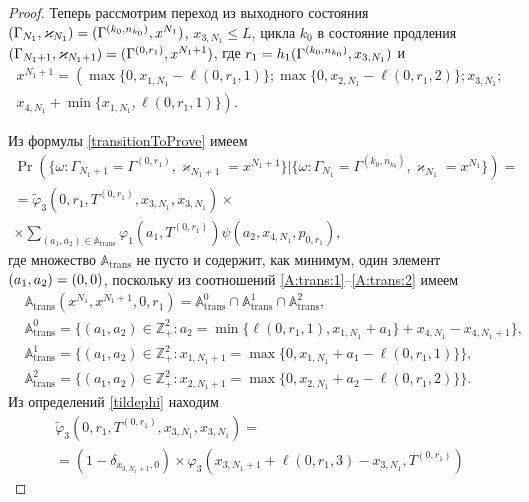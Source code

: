 \begin{proof}
Теперь рассмотрим переход из выходного состояния $(\Gamma_{N_1},  \varkappa_{N_1}) \hm= (\Gamma^{(k_0,  n_{k_0})},  x^{N_1})$,  $x_{3,  N_1} \leqslant L$,  цикла $k_0$ в состояние продления $(\Gamma_{N_1+1}, \varkappa_{N_1+1}) \hm= (\Gamma^{(0, r_1)},  x^{N_1+1})$,  где $r_1 \hm= h_1(\Gamma^{(k_0,  n_{k_0})},  x_{3, N_1})$ и 
\begin{multline*}
x^{N_1+1}=\left(\max{\{0,  x_{1, N_1} - \ell(0,  r_1, 1)\}};
\max{\{0,  x_{2,  N_1} - \ell(0,  r_1,  2)\}};x_{3,  N_1};\right.\\
\left.
x_{4,  N_1} + \min{\{x_{1,  N_1},  \ell(0,  r_1,  1)\}}\right).
\end{multline*}

Из формулы \eqref{transitionToProve} имеем
\begin{multline*}
\Pr (\{\omega\colon \Gamma_{N_1+1}=\Gamma^{(0,  r_1)}, \varkappa_{N_1+1}=x^{N_1+1} \}|\{\omega\colon  \Gamma_{N_1}=\Gamma^{(k_0,  n_{k_0})}, \varkappa_{N_1}=x^{N_1}\})=\\
=\widetilde{\varphi}_3(0,  r_1,  T^{(0,  r_1)}, x_{3,  N_1}, x_{3,  N_1})\times \\
\times
\sum_{(a_1,  a_2)\in {\mathbb A}_{\mathrm{trans}}}\varphi_1(a_1,  T^{(0,  r_1)})  \psi(a_2,  x_{4,  N_1},  p_{0,  r_1}), 
\end{multline*}
где множество ${\mathbb A}_{\mathrm{trans}}$ не пусто и содержит,  как минимум,  один элемент $(a_1,  a_2)\hm=(0,  0)$,  поскольку из соотношений \eqref{A:trans:1}--\eqref{A:trans:2} имеем
\begin{align*}
&{\mathbb A}_{\mathrm{trans}}(x^{N_1},  x^{N_1+1},  0,  r_1) = {\mathbb A}_{\mathrm{trans}}^0 \cap {\mathbb A}_{\mathrm{trans}}^1\cap {\mathbb A}_{\mathrm{trans}}^2, \\
&{\mathbb A}_{\mathrm{trans}}^0 = \{(a_1,  a_2) \in \mathbb{Z}_+^2 \colon a_2 = \min{\{\ell(0,  r_1,  1),  x_{1,  N_1}+a_1}\} +x_{4,  N_1}-x_{4,  N_1+1} \},  \\
&{\mathbb A}_{\mathrm{trans}}^1 = \{(a_1,  a_2) \in \mathbb{Z}_+^2 \colon x_{1,  N_1+1} =\max{\{0,  x_{1, N_1}+a_1-\ell(0,  r_1,  1)\}}\}, \\
& {\mathbb A}_{\mathrm{trans}}^2 = \{(a_1,  a_2) \in \mathbb{Z}_+^2 \colon  x_{2,  N_1+1}=\max{\{0,  x_{2,  N_1}+a_2-\ell(0,  r_1,  2)\}}\}.
\end{align*}
Из определений \eqref{tildephi} находим
\begin{multline*}
\widetilde{\varphi}_3(0,  r_1,  T^{(0,  r_1)},  x_{3,  N_1},  x_{3,  N_1})=\\=(1-\delta_{x_{3,  N_1+1},  0}) \times\varphi_3(x_{3,  N_1+1} + \ell (0,  r_1,  3) - x_{3,  N_1}, T^{(0,  r_1)} )

\end{multline*}
\end{proof}
